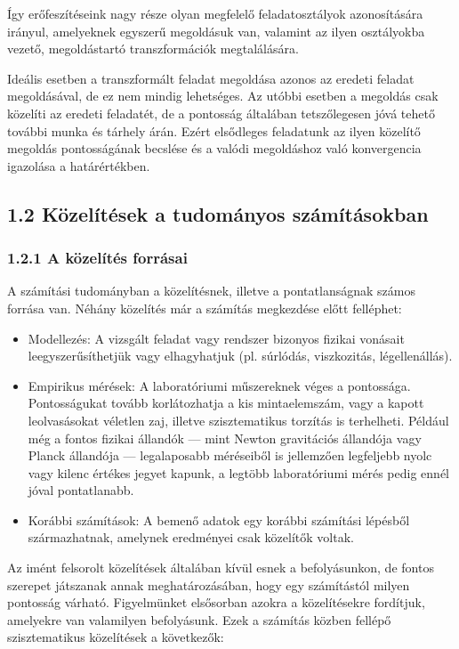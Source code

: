 \documentclass[
  magyar,
  11pt]{article}
\providecommand{\tightlist}{%
  \setlength{\itemsep}{0pt}\setlength{\parskip}{0pt}}
\begin{document}
Így erőfeszítéseink nagy része olyan megfelelő feladatosztályok
azonosítására irányul, amelyeknek egyszerű megoldásuk van, valamint az
ilyen osztályokba vezető, megoldástartó transzformációk megtalálására.

Ideális esetben a transzformált feladat megoldása azonos az eredeti
feladat megoldásával, de ez nem mindig lehetséges. Az utóbbi esetben a
megoldás csak közelíti az eredeti feladatét, de a pontosság általában
tetszőlegesen jóvá tehető további munka és tárhely árán. Ezért
elsődleges feladatunk az ilyen közelítő megoldás pontosságának becslése
és a valódi megoldáshoz való konvergencia igazolása a határértékben.

\subsection{1.2 Közelítések a tudományos
számításokban}\label{kuxf6zeluxedtuxe9sek-a-tudomuxe1nyos-szuxe1muxedtuxe1sokban}

\subsubsection{1.2.1 A közelítés
forrásai}\label{a-kuxf6zeluxedtuxe9s-forruxe1sai}

A számítási tudományban a közelítésnek, illetve a pontatlanságnak számos
forrása van. Néhány közelítés már a számítás megkezdése előtt felléphet:

\begin{itemize}
\tightlist
\item
  Modellezés: A vizsgált feladat vagy rendszer bizonyos fizikai vonásait
  leegyszerűsíthetjük vagy elhagyhatjuk (pl. súrlódás, viszkozitás,
  légellenállás).
\item
  Empirikus mérések: A laboratóriumi műszereknek véges a pontossága.
  Pontosságukat tovább korlátozhatja a kis mintaelemszám, vagy a kapott
  leolvasásokat véletlen zaj, illetve szisztematikus torzítás is
  terhelheti. Például még a fontos fizikai állandók --- mint Newton
  gravitációs állandója vagy Planck állandója --- legalaposabb
  méréseiből is jellemzően legfeljebb nyolc vagy kilenc értékes jegyet
  kapunk, a legtöbb laboratóriumi mérés pedig ennél jóval pontatlanabb.
\item
  Korábbi számítások: A bemenő adatok egy korábbi számítási lépésből
  származhatnak, amelynek eredményei csak közelítők voltak.
\end{itemize}

Az imént felsorolt közelítések általában kívül esnek a befolyásunkon, de
fontos szerepet játszanak annak meghatározásában, hogy egy számítástól
milyen pontosság várható. Figyelmünket elsősorban azokra a közelítésekre
fordítjuk, amelyekre van valamilyen befolyásunk. Ezek a számítás közben
fellépő szisztematikus közelítések a következők:
\end{document}

